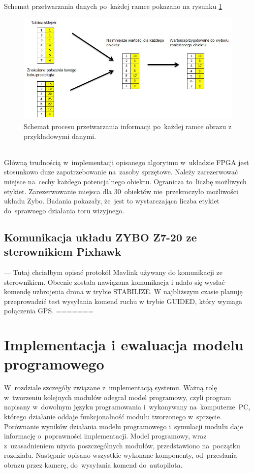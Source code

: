 Schemat przetwarzania danych po~każdej ramce pokazano na rysunku \ref{fig:ind_schemat}
\begin{figure}[h]
	\centering
	\includegraphics[width=\textwidth]{ind_schemat.jpg}
	\caption{Schemat procesu przetwarzania informacji po~każdej ramce obrazu z przykładowymi danymi.}
	\label{fig:ind_schemat}
\end{figure}
\\Główną trudnością w~implementacji opisanego algorytmu w~układzie FPGA jest stosunkowo duze zapotrzebowanie na~zasoby sprzętowe. Należy zarezerwować miejsce na~cechy każdego potencjalnego obiektu. Ogranicza to~liczbę możliwych etykiet. Zarezerwowanie miejsca dla 30~obiektów nie~przekroczyło możliwości układu Zybo. Badania pokazały, że~jest to wystarczająca liczba etykiet do~sprawnego działania toru wizyjnego.
\section{Komunikacja układu ZYBO Z7-20 ze sterownikiem Pixhawk}
\label{sec:komunikacja_pixhawk} 
--- Tutaj chciałbym opisać protokół Mavlink używany do komunikacji ze sterownikiem. Obecnie została nawiązana komunikacja i udało się wysłać komendę uzbrojenia drona w trybie STABILIZE. W najbliższym czasie planuję przeprowadzić test wysyłania komend ruchu w trybie GUIDED, który wymaga połączenia GPS.
=======
\chapter{Implementacja i ewaluacja modelu programowego}
\label{cha:opis_implementacji}

W~rozdziale szczegóły związane z~implementacją systemu. 
Ważną rolę w~tworzeniu kolejnych modułów odegrał model programowy, czyli program napisany w~dowolnym języku programowania i~wykonywany na~komputerze~PC, którego działanie oddaje funkcjonalność modułu tworzonego w~sprzęcie.
Porównanie wyników działania modelu programowego i~symulacji modułu daje informację o~poprawności implementacji. 
Model programowy, wraz z~uzasadnieniem użycia poszczególnych modułów, przedstawiono na~początku rozdziału.
Następnie opisano wszystkie wykonane komponenty, od~przesłania obrazu przez kamerę, do~wysyłania komend do~autopilota.

